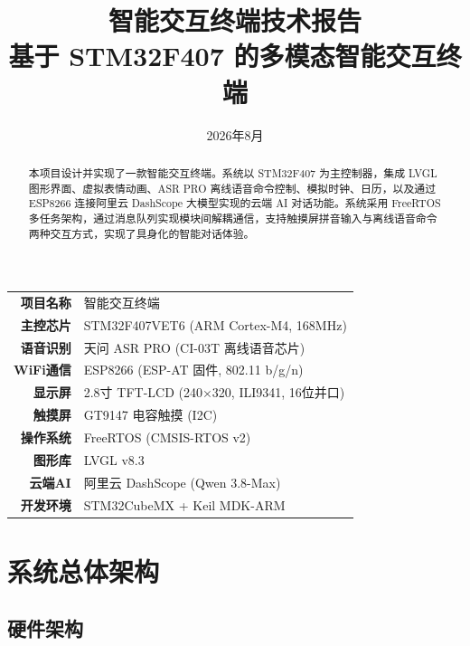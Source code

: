\documentclass[12pt,a4paper]{ctexart}
\title{\textbf{智能交互终端技术报告}\\
       \large 基于 STM32F407 的多模态智能交互终端}
\author{}
\date{2026年8月}
\begin{document}
\maketitle
\thispagestyle{empty}

\begin{center}
\begin{tabular}{rl}
\textbf{项目名称} & 智能交互终端 \\
\textbf{主控芯片} & STM32F407VET6 (ARM Cortex-M4, 168MHz) \\
\textbf{语音识别} & 天问 ASR PRO (CI-03T 离线语音芯片) \\
\textbf{WiFi通信}   & ESP8266 (ESP-AT 固件, 802.11 b/g/n) \\
\textbf{显示屏}     & 2.8寸 TFT-LCD (240×320, ILI9341, 16位并口) \\
\textbf{触摸屏}     & GT9147 电容触摸 (I2C) \\
\textbf{操作系统}   & FreeRTOS (CMSIS-RTOS v2) \\
\textbf{图形库}     & LVGL v8.3 \\
\textbf{云端AI}     & 阿里云 DashScope (Qwen 3.8-Max) \\
\textbf{开发环境}   & STM32CubeMX + Keil MDK-ARM \\
\end{tabular}
\end{center}

\vspace{1cm}

\begin{abstract}
\noindent 本项目设计并实现了一款智能交互终端。系统以 STM32F407 为主控制器，集成 LVGL 图形界面、虚拟表情动画、ASR PRO 离线语音命令控制、模拟时钟、日历，以及通过 ESP8266 连接阿里云 DashScope 大模型实现的云端 AI 对话功能。系统采用 FreeRTOS 多任务架构，通过消息队列实现模块间解耦通信，支持触摸屏拼音输入与离线语音命令两种交互方式，实现了具身化的智能对话体验。
\end{abstract}

\newpage
\tableofcontents
\newpage

\section{系统总体架构}

\subsection{硬件架构}
\end{document}
